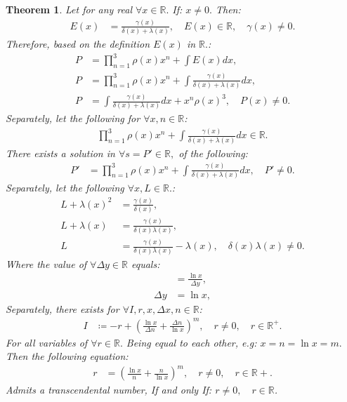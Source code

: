 \documentclass[10pt]{article}
\theoremstyle{plain}
\newtheorem{theorem}{Theorem}[section]
\theoremstyle{definition}
\theoremstyle{remark}
\begin{document}
\begin{theorem}
	Let for any real $\forall x \in \mathbb{R}.$ If: $x \neq 0.$ Then:
	\begin{align*}
		E(x) &= \frac{\gamma(x)}{\delta(x) + \lambda(x)}, \quad E(x) \in \mathbb{R}, \quad \gamma(x) \neq 0.
	\end{align*}
	Therefore, based on the definition $E(x)$ in $\mathbb{R}.$:
	\begin{align*}
		P &= \prod_{n=1}^{3}\rho(x) x^{n} + \int E(x) dx,\\
		P &= \prod_{n=1}^{3}\rho(x) x^{n} + \int \frac{\gamma(x)}{\delta(x) + \lambda(x)} dx,\\
		P &= \int \frac{\gamma(x)}{\delta(x) + \lambda(x)} dx + x^{n} \rho(x)^{3}, \quad P(x) \neq 0.
	\end{align*}
	Separately, let the following for $\forall x, n \in \mathbb{R}$:
	\begin{align*}
		\prod_{n=1}^{3}\rho(x) x^{n} + \int \frac{\gamma(x)}{\delta(x) + \lambda(x)} dx \in \mathbb{R}.
	\end{align*}
	There exists a solution in $\forall s = P' \in \mathbb{R},$ of the following:
	\begin{align*}
		P' &= \prod_{n=1}^{3}\rho(x) x^{n} + \int \frac{\gamma(x)}{\delta(x) + \lambda(x)} dx, \quad P' \neq 0.
	\end{align*}
	Separately, let the following $\forall x, L \in \mathbb{R}.$:
	\begin{align*}
		L + \lambda(x)^{2} &= \frac{\gamma(x)}{\delta(x)},\\
	 	L + \lambda(x) &= \frac{\gamma(x)}{\delta(x)  \lambda(x) },\\
	 	L &= \frac{\gamma(x)}{\delta(x)  \lambda(x) } - \lambda(x), \quad \delta(x)\lambda(x) \neq 0.
	\end{align*}
	Where the value of $\forall \Delta y \in \mathbb{R}$ equals:
	\begin{align*}
		&= \frac{\ln x}{\Delta y},\\
		\Delta y &= \ln x,
	\end{align*}
	Separately, there exists for $\forall I, r, x, \Delta x, n \in \mathbb{R}$:
	\begin{align*}
		I &\coloneq -r + ( \frac{\ln x}{\Delta n} + \frac{\Delta n}{\ln x})^m, \quad r \neq 0, \quad r \in \mathbb{R}^{+}.
	\end{align*}
	For all variables of $\forall r \in \mathbb{R}.$ Being equal to each other, e.g: $x = n = \ln x = m.$ Then the following equation:
	\begin{align*}
		r &= ( \frac{\ln x}{n} + \frac{n}{\ln x})^m, \quad r \neq 0, \quad r \in \mathbb{R}{+}.
	\end{align*}
	Admits a transcendental number, If and only If: $r \neq 0, \quad r \in \mathbb{R}$.
\end{theorem}
\end{document}
